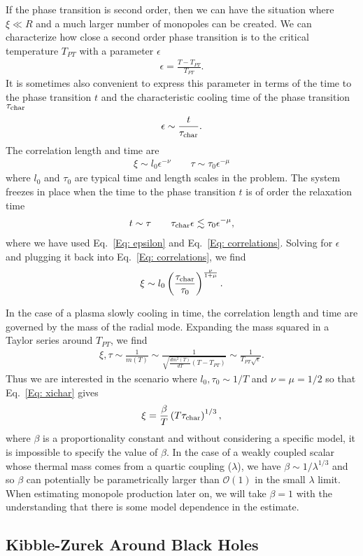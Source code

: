 \documentclass[superscriptaddress,groupedaddress,nofootnoteinbib,11pt]{article}
\newcommand\eea{\end{eqnarray}}
\newcommand\bea{\begin{eqnarray}}
\begin{document}
If the phase transition is second order, then we can have the situation where $\xi \ll R$ and a much larger number of monopoles can be created.  We can characterize how close a second order phase transition is to the critical temperature $T_{PT}$ with a parameter $\epsilon$
\bea
\epsilon = \frac{T - T_{PT}}{T_{PT}}.
\eea
It is sometimes also convenient to express this parameter in terms of the time to the phase transition $t$ and the characteristic cooling time of the phase transition $\tau_{\rm char}$
\bea \label{Eq: epsilon}
\epsilon \sim \frac{t}{\tau_{\rm char}}.
\eea
The correlation length and time are
\bea \label{Eq: correlations}
\xi \sim l_0 \epsilon^{-\nu} \qquad \tau \sim \tau_0 \epsilon^{-\mu}
\eea
where $l_0$ and $\tau_0$ are typical time and length scales in the problem.
The system freezes in place when the time to the phase transition $t$ is of order the relaxation time
\bea
t \sim \tau \qquad \tau_{\rm char} \epsilon \lesssim \tau_0 \epsilon^{-\mu},
\eea
where we have used Eq.~\ref{Eq: epsilon} and Eq.~\ref{Eq: correlations}. 
Solving for $\epsilon$ and plugging it back into Eq.~\ref{Eq: correlations}, we find
\bea \label{Eq: xichar}
\xi \sim l_0 \left ( \frac{\tau_{\rm char}}{\tau_0} \right )^{\frac{\nu}{1+\mu}}.
\eea

In the case of a plasma slowly cooling in time, the correlation length and time are governed by the mass of the radial mode.  Expanding the mass squared in a Taylor series around $T_{PT}$, we find
\bea
\xi, \tau \sim \frac{1}{m(T)} \sim \frac{1}{\sqrt{\frac{d m^2(T)}{dT} \left ( T - T_{PT} \right ) }} \sim \frac{1}{T_{PT} \sqrt{\epsilon}}.
\eea
Thus we are interested in the scenario where $l_0, \tau_0 \sim 1/T$ and $\nu = \mu = 1/2$ so that Eq.~\ref{Eq: xichar} gives
\bea
\label{Eq: xi}
\xi = \frac{\beta }{T} \left ( T \tau_{\rm char} \right )^{1/3},
\eea
where $\beta$ is a proportionality constant and without considering a specific model, it is impossible to specify the value of $\beta$.
In the case of a weakly coupled scalar whose thermal mass comes from a quartic coupling ($\lambda$), we have $\beta \sim 1/\lambda^{1/3}$ and so $\beta$ can potentially be parametrically larger than $\mathcal{O}(1)$ in the small $\lambda$ limit.  When estimating monopole production later on, we will take $\beta = 1$ with the understanding that there is some model dependence in the estimate.


\subsection{Kibble-Zurek Around Black Holes}
\end{document}
